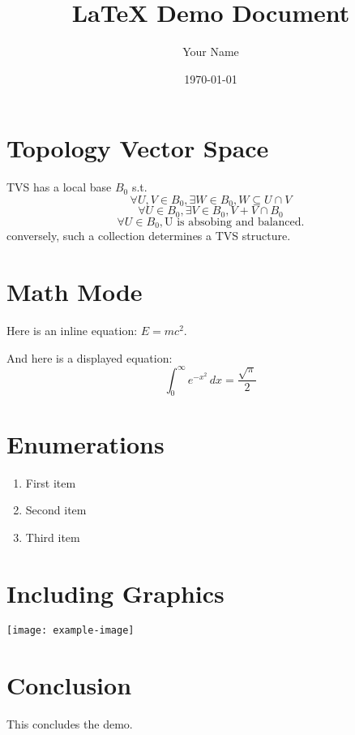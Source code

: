 \documentclass{article}
\title{LaTeX Demo Document}
\author{Your Name}
\date{\today}
\begin{document}
\maketitle

\section{Topology Vector Space}
TVS has a local base $B_0$ s.t. 
\[ \forall U, V \in B_{0}, \exists W \in B_{0}, W \subseteq U \cap V \]
\[ \forall U \in B_{0}, \exists V \in B_{0}, V + V \cap B_{0 }\]
\[ \forall U \in B_{0}, \text{U is absobing and balanced.}\]
conversely, such a collection determines a TVS structure.
\section{Math Mode}
Here is an inline equation: \( E = mc^2 \).

And here is a displayed equation:
\[
\int_{0}^{\infty} e^{-x^2} \, dx = \frac{\sqrt{\pi}}{2}
\]

\section{Enumerations}
\begin{enumerate}
  \item First item
  \item Second item
  \item Third item
\end{enumerate}

\section{Including Graphics}
\begin{center}
\texttt{[image: example-image]}
\end{center}

\section{Conclusion}
This concludes the demo.
\end{document}
